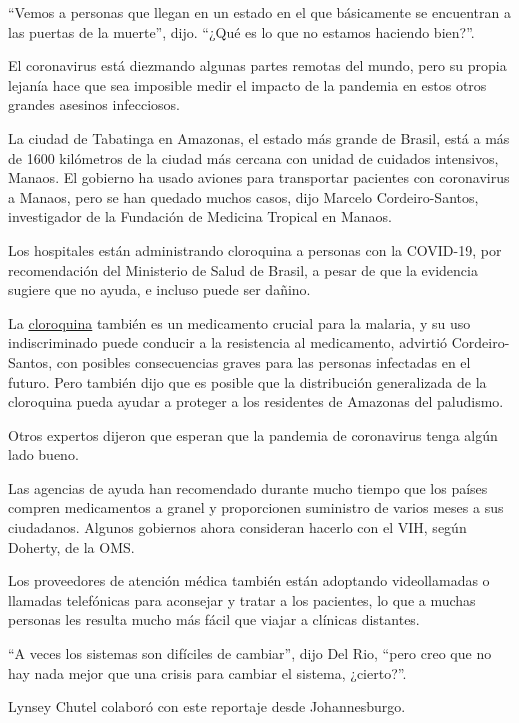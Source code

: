 ``Vemos a personas que llegan en un estado en el que básicamente se
encuentran a las puertas de la muerte'', dijo. ``¿Qué es lo que no
estamos haciendo bien?''.

El coronavirus está diezmando algunas partes remotas del mundo, pero su
propia lejanía hace que sea imposible medir el impacto de la pandemia en
estos otros grandes asesinos infecciosos.

La ciudad de Tabatinga en Amazonas, el estado más grande de Brasil, está
a más de 1600 kilómetros de la ciudad más cercana con unidad de cuidados
intensivos, Manaos. El gobierno ha usado aviones para transportar
pacientes con coronavirus a Manaos, pero se han quedado muchos casos,
dijo Marcelo Cordeiro-Santos, investigador de la Fundación de Medicina
Tropical en Manaos.

Los hospitales están administrando cloroquina a personas con la
COVID-19, por recomendación del Ministerio de Salud de Brasil, a pesar
de que la evidencia sugiere que no ayuda, e incluso puede ser dañino.

La
\href{https://www.nytimes3xbfgragh.onion/es/2020/07/23/espanol/america-latina/bolivia-cloro-coronavirus-ivermectina.html}{cloroquina}
también es un medicamento crucial para la malaria, y su uso
indiscriminado puede conducir a la resistencia al medicamento, advirtió
Cordeiro-Santos, con posibles consecuencias graves para las personas
infectadas en el futuro. Pero también dijo que es posible que la
distribución generalizada de la cloroquina pueda ayudar a proteger a los
residentes de Amazonas del paludismo.

Otros expertos dijeron que esperan que la pandemia de coronavirus tenga
algún lado bueno.

Las agencias de ayuda han recomendado durante mucho tiempo que los
países compren medicamentos a granel y proporcionen suministro de varios
meses a sus ciudadanos. Algunos gobiernos ahora consideran hacerlo con
el VIH, según Doherty, de la OMS.

Los proveedores de atención médica también están adoptando videollamadas
o llamadas telefónicas para aconsejar y tratar a los pacientes, lo que a
muchas personas les resulta mucho más fácil que viajar a clínicas
distantes.

``A veces los sistemas son difíciles de cambiar'', dijo Del Rio, ``pero
creo que no hay nada mejor que una crisis para cambiar el sistema,
¿cierto?''.

Lynsey Chutel colaboró con este reportaje desde Johannesburgo.

